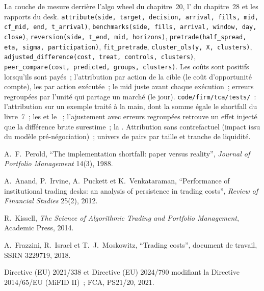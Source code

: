 \begin{build}
 La couche de mesure derrière l'algo wheel du chapitre~20, l' du chapitre~28 et les rapports du desk.
 \texttt{attribute(side, target, decision, arrival, fills, mid, cf\_mid, end, t\_arrival)},
\texttt{benchmarks(side, fills, arrival, window, day, close)}, \texttt{reversion(side, t\_end, mid, horizons)}, \texttt{pretrade(half\_spread, eta, sigma, participation)},
\texttt{fit\_pretrade}, \texttt{cluster\_ols(y, X, clusters)}, \texttt{adjusted\_difference(cost, treat, controls, clusters)},
\texttt{peer\_compare(cost, predicted, groups, clusters)}.
 Les coûts sont positifs lorsqu'ils sont payés~; l'attribution par action de la cible (le coût d'opportunité compte), les  par action exécutée~; le mid juste avant chaque
exécution~; erreurs regroupées par l'unité qui partage un marché (le jour).
 \texttt{code/firm/tca/tests/}~: l'attribution sur un exemple traité à la main, dont la somme égale le shortfall du livre~7~; les  et le ~;
l'ajustement avec erreurs regroupées retrouve un effet injecté que la différence brute surestime~; la .
 Attribution sans contrefactuel (impact issu du modèle pré-négociation)~; univers de pairs par taille et tranche de liquidité.
\end{build}

\begin{omsources}
\item A.~F.~Perold, ``The implementation shortfall: paper versus reality'', \emph{Journal of Portfolio Management} 14(3), 1988.
\item A.~Anand, P.~Irvine, A.~Puckett et K.~Venkataraman, ``Performance of institutional trading desks: an analysis of persistence in trading
costs'', \emph{Review of Financial Studies} 25(2), 2012.
\item R.~Kissell, \emph{The Science of Algorithmic Trading and Portfolio Management}, Academic Press, 2014.
\item A.~Frazzini, R.~Israel et T.~J.~Moskowitz, ``Trading costs'', document de travail, SSRN 3229719, 2018.
\item Directive (EU) 2021/338 et Directive (EU) 2024/790 modifiant la Directive 2014/65/EU (MiFID II)~; FCA, PS21/20, 2021.
\end{omsources}

